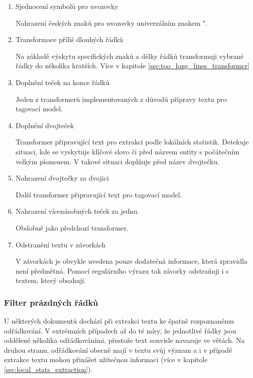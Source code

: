 \documentclass[thesis=M,czech]{FITthesis}[2019/12/23]
\begin{document}
\begin{enumerate}
    \item Sjednocení symbolů pro uvozovky
    
    Nahrazení českých znaků pro uvozovky univerzálním znakem ".
    
    \item Transformace příliš dlouhých řádků
    
    Na základě výskytu specifických znaků a délky řádků transformuji vybrané řádky do několika kratších. Více v kapitole \ref{sec:too_long_lines_transformer}
    
    \item Doplnění teček na konce řádků
    
    Jeden z transformerů implementovaných z důvodů přípravy textu pro tagovací model.
    
    \item Doplnění dvojteček
    
    Transformer připravující text pro extrakci podle lokálních statistik. Detekuje situaci, kde se vyskytuje klíčové slovo  či  před názvem entity s počátečním velkým písmenem. V takové situaci doplňuje před název dvojtečku.
    
    \item Nahrazení dvojtečky za dvojici 
    
    Další transformer připravující text pro tagovací model.
    
    \item Nahrazení vícenásobných teček za jednu.
    
    Obdobně jako předchozí transformer.
    
    \item Odstranění textu v závorkách
    
    V závorkách je obvykle uvedena pouze dodatečná informace, která zpravidla není předmětná. Pomocí regulárního výrazu tak závorky odstraňuji i s textem, který obsahují.
    
\end{enumerate}

\subsubsection{Filter prázdných řádků}
\label{sec:blank_lines_filter}

U některých dokumentů dochází při extrakci textu ke špatně rozpoznanému odřádkování. V extrémních případech až do té míry, že jednotlivé řádky jsou oddělené několika odřádkováními, přestože text souvisle navazuje ve větách. Na druhou stranu, odřádkování obecně mají v textu svůj význam a i v případě extrakce textu mohou přinášet užitečnou informaci (více v kapitole \ref{sec:local_stats_extraction}).
\end{document}
